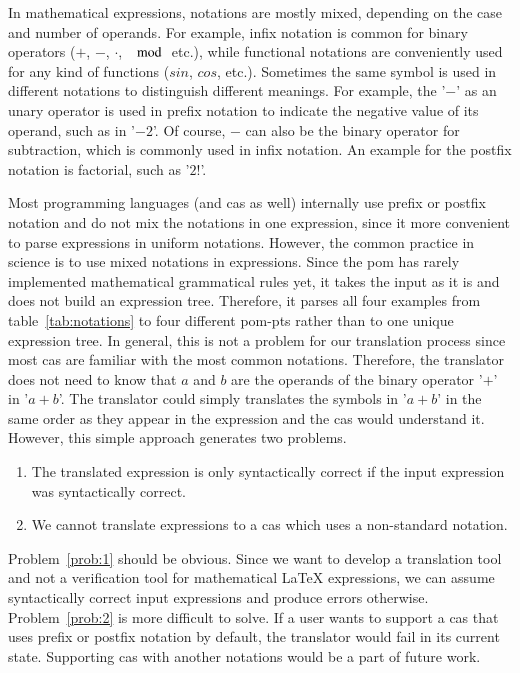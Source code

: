 In mathematical expressions, notations are mostly mixed, depending on the case and number of operands. For example, infix notation is common for binary operators ($+$, $-$, $\cdot$, $\mod$ etc.), while functional notations are conveniently used for any kind of functions ($sin$, $cos$, etc.). Sometimes the same symbol is used in different notations to distinguish different meanings. For example, the '$-$' as an unary operator is used in prefix notation to indicate the negative value of its operand, such as in '$-2$'. Of course, $-$ can also be the binary operator for subtraction, which is commonly used in infix notation. An example for the postfix notation is factorial, such as '$2!$'.



Most programming languages (and \gls*{cas} as well) internally use prefix or postfix notation and do not mix the notations in one expression, since it more convenient to parse expressions in uniform notations. However, the common practice in science is to use mixed notations in expressions. Since the \gls*{pom} has rarely implemented mathematical grammatical rules yet, it takes the input as it is and does not build an expression tree. Therefore, it parses all four examples from table~\ref{tab:notations} to four different \gls*{pom-pt}s rather than to one unique expression tree. In general, this is not a problem for our translation process since most \gls*{cas} are familiar with the most common notations. Therefore, the translator does not need to know that $a$ and $b$ are the operands of the binary operator '$+$' in '$a+b$'. The translator could simply translates the symbols in '$a+b$' in the same order as they appear in the expression and the \gls*{cas} would understand it. However, this simple approach generates two problems.
\begin{enumerate}%
\item \label{prob:1} The translated expression is only syntactically correct if the input expression was syntactically correct.
\item \label{prob:2} We cannot translate expressions to a \gls*{cas} which uses a non-standard notation.
\end{enumerate}

Problem~\ref{prob:1} should be obvious. Since we want to develop a translation tool and not a verification tool for mathematical \LaTeX{} expressions, we can assume syntactically correct input expressions and produce errors otherwise. Problem~\ref{prob:2} is more difficult to solve. If a user wants to support a \gls*{cas} that uses prefix or postfix notation by default, the translator would fail in its current state. Supporting \gls*{cas} with another notations would be a part of future work.

